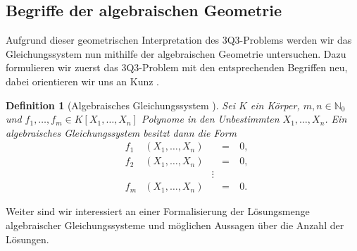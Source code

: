\documentclass[a4paper,oneside, 11pt, openany%
]{article}
\newcommand{\N}{{\mathbb N}}
\theoremstyle{custom}
\theoremstyle{custom}
\newtheorem{definition}[theorem]{Definition}
\begin{document}
	\subsection{Begriffe der algebraischen Geometrie}
	Aufgrund dieser geometrischen Interpretation des 3Q3-Problems werden wir das Gleichungssystem nun mithilfe der algebraischen Geometrie untersuchen. Dazu formulieren wir zuerst das 3Q3-Problem mit den entsprechenden Begriffen neu, dabei orientieren wir uns an Kunz \cite{kunz2012introduction,kunz2013}.
	
	\begin{definition}[Algebraisches Gleichungssystem {\cite{kunz2013}}]\label{def:alg_gs}
		Sei $K$ ein Körper, $m,n \in \N_{0}$ und $f_1,\ldots,f_m \in K\left[X_{1},\ldots,X_n\right]$ Polynome in den Unbestimmten $X_1,\ldots,X_n$. Ein algebraisches Gleichungssystem besitzt dann die Form
		\begin{equation}\label{eqn:alg_gs}
			\begin{alignedat}{5}
				&f_{1}&\left(X_{1}, \ldots, X_{n} \right)& \ &=\ &0,\\
				&f_{2}&\left(X_{1}, \ldots, X_{n} \right)& \ &=\ &0,\\
				&&&  \vdots& &\\
				&f_{m}&\left(X_{1}, \ldots, X_{n} \right)& \ &=\ &0.
			\end{alignedat}
		\end{equation}
	\end{definition} 
	Weiter sind wir interessiert an einer Formalisierung der Lösungsmenge algebraischer Gleichungssysteme und möglichen Aussagen über die Anzahl der Lösungen.
	
\end{document}
